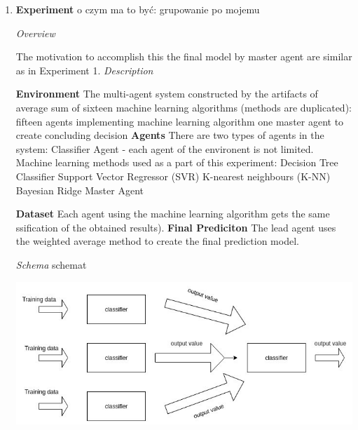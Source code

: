 \begin{enumerate}




\newpage
\item 
\textbf{Experiment}
o czym ma to być:
grupowanie po mojemu 

\textit{Overview}

The motivation to accomplish this the final model by master agent are similar as in Experiment 1.
\newline \newline
\textit{Description}
\begin{outline}[enumerate]
	\1 \textbf{Environment} \newline
	The multi-agent system constructed by the artifacts of average sum of sixteen machine learning algorithms (methods are duplicated):
	\2 fifteen agents implementing machine learning algorithm
	\2 one master agent to create concluding decision
	\1 \textbf{Agents}
	\newline
	There are two types of agents in the system:
	\2 Classifier Agent - each agent  of the environent is not limited. Machine learning methods used as a part of this experiment:
	\3 Decision Tree Classifier
	\3 Support Vector Regressor (SVR)
	\3 K-nearest neighbours (K-NN)
	\3 Bayesian Ridge
	\2 Master Agent		
	
	\1 \textbf{Dataset}
	\newline
	Each agent using the machine learning algorithm gets the same ssification of the obtained results).
	\1 \textbf{Final Prediciton}
	\newline
	The lead agent uses the weighted average method to create the final prediction model.
\end{outline}

\textit{Schema}
\newline schemat

\begin{center}
	\includegraphics[width=1\textwidth, keepaspectratio]{diagrams/example.jpg}
	\center
	\label{fig:exp1_schema}
\end{center}


\end{enumerate}
